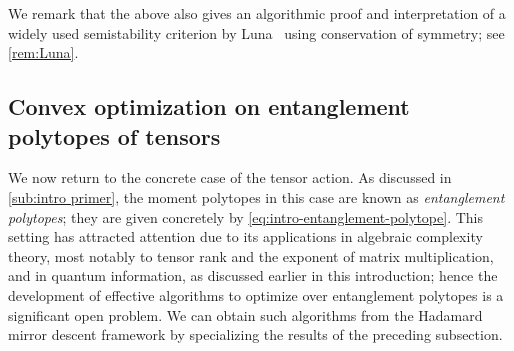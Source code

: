 \documentclass[11pt,letterpaper]{article}
\numberwithin{equation}{section}
\begin{document}
We remark that the above also gives an algorithmic proof and interpretation of a widely used semistability criterion by Luna~\cite[Cor.~2]{Luna-75} using conservation of symmetry; see \cref{rem:Luna}.

\subsection{Convex optimization on entanglement polytopes of tensors}\label{sub:convex-entanglement}
We now return to the concrete case of the tensor action.
As discussed in \cref{sub:intro primer}, the moment polytopes in this case are known as \emph{entanglement polytopes}; they are given concretely by \cref{eq:intro-entanglement-polytope}.
This setting has attracted attention due to its applications in algebraic complexity theory, most notably to tensor rank and the exponent of matrix multiplication, and in quantum information, as discussed earlier in this introduction; hence the development of effective algorithms to optimize over entanglement polytopes is a significant open problem.
We can obtain such algorithms from the Hadamard mirror descent framework by specializing the results of the preceding subsection.
\end{document}
